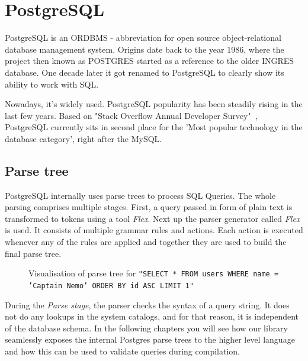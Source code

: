 \section{PostgreSQL}
PostgreSQL is an ORDBMS - abbreviation for open source object-relational database management system. Origins date back to the year 1986, where the project then known as POSTGRES started as a reference to the older INGRES database. One decade later it got renamed to PostgreSQL to clearly show its ability to work with SQL.\cite{PostgreSQL} 

Nowadays, it's widely used. PostgreSQL popularity has been steadily rising in the last few years. Based on "Stack Overflow Annual Developer Survey"~\cite{Stackoverflow survey}, PostgreSQL currently sits in second place for the 'Most popular technology in the database category', right after the MySQL.

\subsection{Parse tree}
PostgreSQL internally uses parse trees to process SQL Queries. The whole parsing comprises multiple stages. First, a query passed in form of plain text is transformed to tokens using a tool \textit{Flex}. Next up the parser generator called \textit{Flex} is used. It consists of multiple grammar rules and actions. Each action is executed whenever any of the rules are applied and together they are used to build the final parse tree.

\newpage

\begin{figure}[h]
  \caption {Visualisation of parse tree for \texttt{"SELECT * FROM users WHERE name = 'Captain Nemo' ORDER BY id ASC LIMIT 1"}\cite{Parse tree image}}
\end{figure}

During the \textit{Parse stage}, the parser checks the syntax of a query string. It does not do any lookups in the system catalogs, and for that reason, it is independent of the database schema. In the following chapters you will see how our library seamlessly exposes the internal Postgres parse trees to the higher level language and how this can be used to validate queries during compilation.

